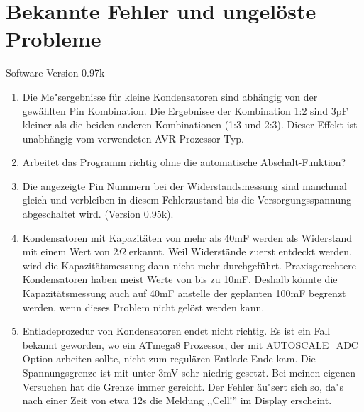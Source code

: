
\chapter{Bekannte Fehler und ungel\"oste Probleme}
{\center Software Version 0.97k}

\begin{enumerate}
\item Die Me"sergebnisse f\"ur kleine Kondensatoren sind abh\"angig von der gew\"ahlten Pin Kombination.
Die Ergebnisse der Kombination 1:2 sind 3pF kleiner als die beiden anderen Kombinationen (1:3 und 2:3).
Dieser Effekt ist unabh\"angig vom verwendeten AVR Prozessor Typ.
\item Arbeitet das Programm richtig ohne die automatische Abschalt-Funktion?
\item Die angezeigte Pin Nummern bei der Widerstandsmessung sind manchmal gleich und verbleiben in diesem
Fehlerzustand bis die Versorgungsspannung abgeschaltet wird.
(Version 0.95k).
\item Kondensatoren mit Kapazit\"aten von mehr als 40mF werden als Widerstand mit einem Wert von \(2\Omega\) erkannt.
Weil Widerst\"ande zuerst entdeckt werden, wird die Kapazit\"atsmessung dann nicht mehr durchgef\"uhrt.
Praxisgerechtere Kondensatoren haben meist Werte von bis zu 10mF.
Deshalb k\"onnte die Kapazit\"atsmessung auch auf 40mF anstelle der geplanten 100mF begrenzt werden, wenn dieses Problem nicht
gel\"ost werden kann.
\item Entladeprozedur von Kondensatoren endet nicht richtig. Es ist ein Fall bekannt geworden, wo ein ATmega8 Prozessor,
der mit AUTOSCALE\_ADC Option arbeiten sollte, nicht zum regul\"aren Entlade-Ende kam.
Die Spannungsgrenze ist mit unter 3mV sehr niedrig gesetzt. Bei meinen eigenen Versuchen hat die Grenze immer gereicht.
Der Fehler \"au"sert sich so, da"s nach einer Zeit von etwa 12s die Meldung ,,Cell!'' im Display erscheint.

\end{enumerate}
